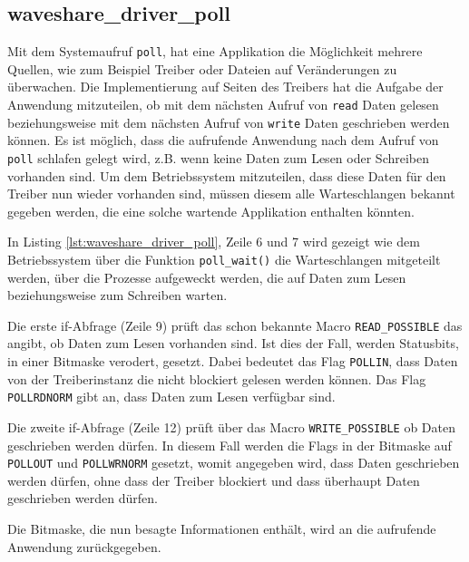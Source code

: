 \subsection{waveshare\_driver\_poll}  %
Mit dem Systemaufruf \texttt{poll}, hat eine Applikation die Möglichkeit mehrere Quellen, wie zum Beispiel Treiber oder Dateien auf Veränderungen zu überwachen. Die Implementierung auf Seiten des Treibers hat die Aufgabe der Anwendung mitzuteilen, ob mit dem nächsten Aufruf von \texttt{read} Daten gelesen beziehungsweise mit dem nächsten Aufruf von \texttt{write} Daten geschrieben werden können. Es ist möglich, dass die aufrufende Anwendung nach dem Aufruf von \texttt{poll} schlafen gelegt wird, z.B. wenn keine Daten zum Lesen oder Schreiben vorhanden sind. Um dem Betriebssystem mitzuteilen, dass diese Daten für den Treiber nun wieder vorhanden sind, müssen diesem alle Warteschlangen bekannt gegeben werden, die eine solche wartende Applikation enthalten könnten.

In Listing \ref{lst:waveshare_driver_poll}, Zeile 6 und 7 wird gezeigt wie dem Betriebssystem über die Funktion \texttt{poll\_wait()} die Warteschlangen mitgeteilt werden, über die Prozesse aufgeweckt werden, die auf Daten zum Lesen beziehungsweise zum Schreiben warten. 

Die erste if-Abfrage (Zeile 9) prüft das schon bekannte Macro \texttt{READ\_POSSIBLE} das angibt, ob Daten zum Lesen vorhanden sind. Ist dies der Fall, werden Statusbits, in einer Bitmaske verodert, gesetzt. Dabei bedeutet das Flag \texttt{POLLIN}, dass Daten von der Treiberinstanz die nicht blockiert gelesen werden können. Das Flag \texttt{POLLRDNORM} gibt an, dass Daten zum Lesen verfügbar sind.

Die zweite if-Abfrage (Zeile 12) prüft über das Macro \texttt{WRITE\_POSSIBLE} ob Daten geschrieben werden dürfen. In diesem Fall werden die Flags in der Bitmaske auf \texttt{POLLOUT} und \texttt{POLLWRNORM} gesetzt, womit angegeben wird, dass Daten geschrieben werden dürfen, ohne dass der Treiber blockiert und dass überhaupt Daten geschrieben werden dürfen. 

Die Bitmaske, die nun besagte Informationen enthält, wird an die aufrufende Anwendung zurückgegeben. 




